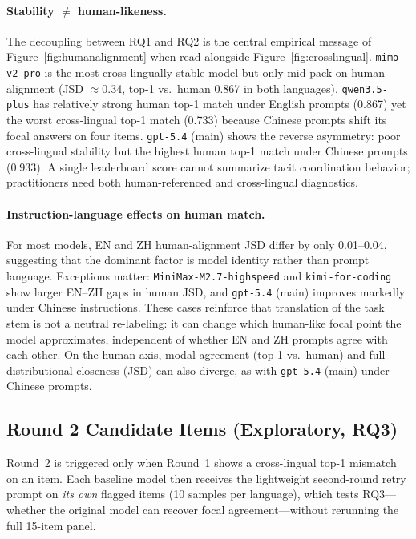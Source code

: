 \documentclass[11pt]{article}
\begin{document}
\paragraph{Stability $\neq$ human-likeness.}
The decoupling between RQ1 and RQ2 is the central empirical message of Figure~\ref{fig:humanalignment} when read alongside Figure~\ref{fig:crosslingual}. \texttt{mimo-v2-pro} is the most cross-lingually stable model but only mid-pack on human alignment (JSD $\approx$0.34, top-1 vs.\ human 0.867 in both languages). \texttt{qwen3.5-plus} has relatively strong human top-1 match under English prompts (0.867) yet the worst cross-lingual top-1 match (0.733) because Chinese prompts shift its focal answers on four items. \texttt{gpt-5.4} (main) shows the reverse asymmetry: poor cross-lingual stability but the highest human top-1 match under Chinese prompts (0.933). A single leaderboard score cannot summarize tacit coordination behavior; practitioners need both human-referenced and cross-lingual diagnostics.

\paragraph{Instruction-language effects on human match.}
For most models, EN and ZH human-alignment JSD differ by only 0.01--0.04, suggesting that the dominant factor is model identity rather than prompt language. Exceptions matter: \texttt{MiniMax-M2.7-highspeed} and \texttt{kimi-for-coding} show larger EN--ZH gaps in human JSD, and \texttt{gpt-5.4} (main) improves markedly under Chinese instructions. These cases reinforce that translation of the task stem is not a neutral re-labeling: it can change which human-like focal point the model approximates, independent of whether EN and ZH prompts agree with each other. On the human axis, modal agreement (top-1 vs.\ human) and full distributional closeness (JSD) can also diverge, as with \texttt{gpt-5.4} (main) under Chinese prompts.

\subsection{Round 2 Candidate Items (Exploratory, RQ3)}

Round~2 is triggered only when Round~1 shows a cross-lingual top-1 mismatch on an item. Each baseline model then receives the lightweight second-round retry prompt on \emph{its own} flagged items (10 samples per language), which tests RQ3---whether the original model can recover focal agreement---without rerunning the full 15-item panel.
\end{document}
